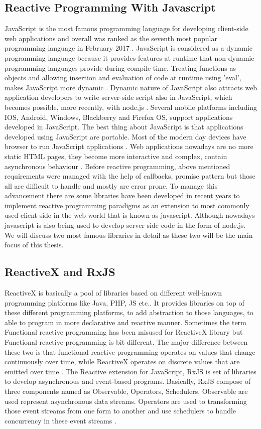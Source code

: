 \subsection{Reactive Programming With Javascript}
JavaScript is the most famous programming language for developing client-side web applications and overall was ranked as the seventh most popular
programming language in February 2017 \citep{TiobeIndex}. JavaScript is considered as a dynamic programming language because it provides features at runtime that non-dynamic programming languages provide during compile time. Treating functions as objects and allowing insertion and evaluation of code at runtime using 'eval', makes JavaScript more dynamic \citep{White2010}. Dynamic nature of JavaScript also attracts web application developers to write server-side script also in JavaScript, which becomes possible, more recently, with node.js \citep{NodeJs}. Several mobile platforms including IOS, Android, Windows, Blackberry and Firefox OS, support applications developed in JavaScript. The best thing about JavaScript is that applications developed using JavaScript are portable. Most of the modern day devices have browser to run JavaScript applications \citep{Richards:2010:ADB:1809028.1806598}.
Web applications nowadays are no more static HTML pages, they become more interactive and complex, contain asynchronous behaviour \citep{6068340}. Before reactive programming, above mentioned requirements were managed with the help of callbacks, promise pattern but those all are difficult to handle and mostly are error prone. To manage this advancement there are some libraries have been developed in recent years to implement reactive programming paradigms as an extension to most commonly used client side in the web world that is known as javascript. Although nowadays javascript is also being used to develop server side code in the form of node.js. We will discuss two most famous libraries in detail as these two will be the main focus of this thesis.

\subsection{ReactiveX and RxJS}
ReactiveX is basically a pool of libraries based on different well-known programming platforms like Java, PHP, JS etc.. It provides libraries on top of these different programming platforms, to add abstraction to those languages, to able to program in more declarative and reactive manner. Sometimes the term Functional reactive programming has been misused for ReactiveX library but Functional reactive programming is bit different. The major difference between these two is that functional reactive programming operates on values that change continuously over time, while ReactiveX operates on discrete values that are emitted over time \citep{reactivex}. 
The Reactive extension for JavaScript, RxJS is set of libraries to develop asynchronous and event-based programs. Basically, RxJS compose of three components named as Observable, Operators, Schedulers. Observable are used represent asynchronous data streams. Operators are used to transforming those event streams from one form to another and use schedulers to handle concurrency in these event streams \citep{rxjs}.

